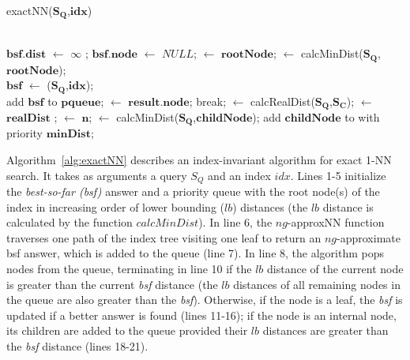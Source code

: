 \begin{algorithm}[tb]
	{\scriptsize
		\caption{exactNN({$\bm{S_Q}$},{$\bm{idx}$})}
		\begin{algorithmic}[1]
			\\{$\bm{bsf.dist}$} $\gets$ $\infty$ ; {$\bm{bsf.node}$} $\gets$ $NULL$;		
			 $\gets$ {$\bm{rootNode}$};
			 $\gets$ calcMinDist({$\bm{S_Q}$},{$\bm{rootNode}$});			
			\EndFor
			\\{$\bm{bsf}$} $\gets$ {\color{mygreen}}({{$\bm{S_Q}$},$\bm{idx}$}); 		
			\\add {$\bm{bsf}$} to {$\bm{pqueue}$};
			 $\gets$ {$\bm{result.node}$};
			break;
			\EndIf                 
			         
			 $\gets$ calcRealDist({$\bm{S_Q}$},{$\bm{S_C}$});
			 $\gets$ {$\bm{realDist}$} ;
			 $\gets$ {$\bm{n}$};		               
			\EndIf                  
			\EndFor        
			\Else  {}
			 $\gets$ calcMinDist({$\bm{S_Q}$},{$\bm{childNode}$});
			 add {$\bm{childNode}$} to
			 with priority {$\bm{minDist}$}; 
			\EndIf                  
			\EndFor        
			\EndIf 
			\EndWhile\label{euclidendwhile}
			\State {}%
		\end{algorithmic}
		\label{alg:exactNN}
	} %
\end{algorithm}

Algorithm~\ref{alg:exactNN} describes an index-invariant algorithm for exact 1-NN search. It takes as arguments a query $S_Q$ and an index $idx$.
Lines 1-5 initialize the \emph{best-so-far (bsf)} answer and a priority queue with the root node(s) of the index in increasing order of lower bounding ($lb$) distances (the $lb$ distance is calculated by the function $calcMinDist$). 
In line 6, the $ng$-approxNN function traverses one path of the index tree visiting one leaf to return an $ng$-approximate bsf answer, {\color{black} which} is added to the queue (line 7). 
In line 8, the algorithm pops nodes from the queue, terminating in line 10 if the $lb$ distance of the current node is greater than the current \emph{bsf} distance (the $lb$ distances of all remaining nodes in the queue are also greater than the \emph{bsf}). 
Otherwise, if the node is a leaf, the \emph{bsf} is updated if a better answer is found (lines 11-16); if the node is an internal node, its children are added to the queue provided their $lb$ distances are greater than the \emph{bsf} distance (lines 18-21).

